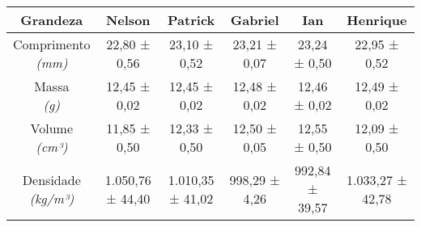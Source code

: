 \documentclass{article}
\begin{document}
\begin{table}[h!]
\centering
\begin{tabular}{c c c c c c }
\toprule
Grandeza & Nelson & Patrick & Gabriel & Ian & Henrique\\
\midrule
\shortstack{Comprimento\\\textit{(mm)}} & 22,80 ± 0,56 & 23,10 ± 0,52 & 23,21 ± 0,07 & 23,24 ± 0,50 & 22,95 ± 0,52\\[4pt]
\shortstack{Massa\\\textit{(g)}} & 12,45 ± 0,02 & 12,45 ± 0,02 & 12,48 ± 0,02 & 12,46 ± 0,02 & 12,49 ± 0,02\\[4pt]
\shortstack{Volume\\\textit{(cm³)}} & 11,85 ± 0,50 & 12,33 ± 0,50 & 12,50 ± 0,05 & 12,55 ± 0,50 & 12,09 ± 0,50\\[4pt]
\shortstack{Densidade\\\textit{(kg/m³)}} & 1.050,76 ± 44,40 & 1.010,35 ± 41,02 & 998,29 ± 4,26 & 992,84 ± 39,57 & 1.033,27 ± 42,78\\[4pt]
\bottomrule
\end{tabular}
\end{table}
\end{document}
